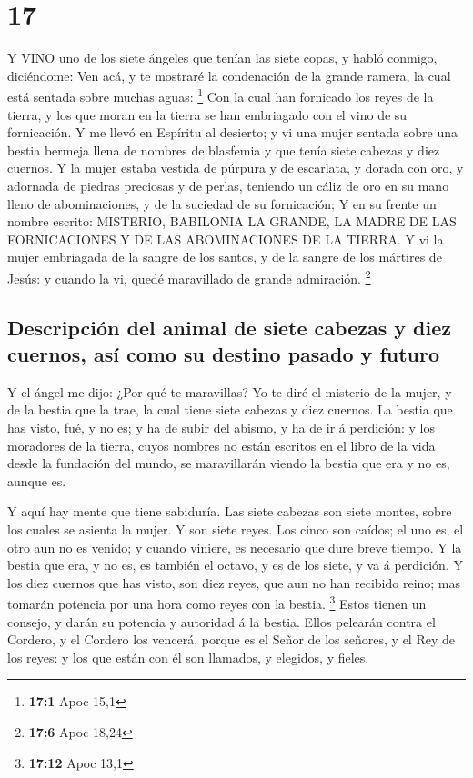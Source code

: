 \hypertarget{section-16}{%
\section{17}\label{section-16}}

 Y VINO uno de los siete ángeles que tenían las siete copas,
y habló conmigo, diciéndome: Ven acá, y te mostraré la condenación de la
grande ramera, la cual está sentada sobre muchas aguas: \footnote{\textbf{17:1}
  Apoc 15,1}  Con la cual han fornicado los reyes de la
tierra, y los que moran en la tierra se han embriagado con el vino de su
fornicación.  Y me llevó en Espíritu al desierto; y vi una
mujer sentada sobre una bestia bermeja llena de nombres de blasfemia y
que tenía siete cabezas y diez cuernos.  Y la mujer estaba
vestida de púrpura y de escarlata, y dorada con oro, y adornada de
piedras preciosas y de perlas, teniendo un cáliz de oro en su mano lleno
de abominaciones, y de la suciedad de su fornicación;  Y en
su frente un nombre escrito: MISTERIO, BABILONIA LA GRANDE, LA MADRE DE
LAS FORNICACIONES Y DE LAS ABOMINACIONES DE LA TIERRA.  Y vi
la mujer embriagada de la sangre de los santos, y de la sangre de los
mártires de Jesús: y cuando la vi, quedé maravillado de grande
admiración. \footnote{\textbf{17:6} Apoc 18,24}

\hypertarget{descripciuxf3n-del-animal-de-siete-cabezas-y-diez-cuernos-asuxed-como-su-destino-pasado-y-futuro}{%
\subsection{Descripción del animal de siete cabezas y diez cuernos, así
como su destino pasado y
futuro}\label{descripciuxf3n-del-animal-de-siete-cabezas-y-diez-cuernos-asuxed-como-su-destino-pasado-y-futuro}}

 Y el ángel me dijo: ¿Por qué te maravillas? Yo te diré el
misterio de la mujer, y de la bestia que la trae, la cual tiene siete
cabezas y diez cuernos.  La bestia que has visto, fué, y no
es; y ha de subir del abismo, y ha de ir á perdición: y los moradores de
la tierra, cuyos nombres no están escritos en el libro de la vida desde
la fundación del mundo, se maravillarán viendo la bestia que era y no
es, aunque es.

 Y aquí hay mente que tiene sabiduría. Las siete cabezas son
siete montes, sobre los cuales se asienta la mujer.  Y son
siete reyes. Los cinco son caídos; el uno es, el otro aun no es venido;
y cuando viniere, es necesario que dure breve tiempo.  Y la
bestia que era, y no es, es también el octavo, y es de los siete, y va á
perdición.  Y los diez cuernos que has visto, son diez
reyes, que aun no han recibido reino; mas tomarán potencia por una hora
como reyes con la bestia. \footnote{\textbf{17:12} Apoc 13,1}
 Estos tienen un consejo, y darán su potencia y autoridad á
la bestia.  Ellos pelearán contra el Cordero, y el Cordero
los vencerá, porque es el Señor de los señores, y el Rey de los reyes: y
los que están con él son llamados, y elegidos, y fieles.

